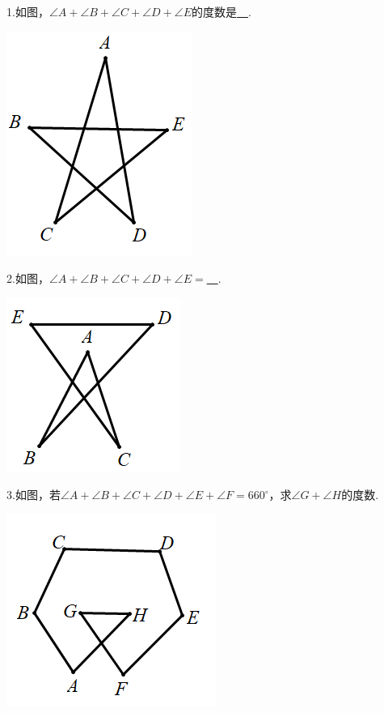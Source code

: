 1.如图，$\angle A+\angle B+\angle C+\angle D+\angle E$的度数是\underline{~\hspace{1cm}~}.

 \includegraphics[scale=0.5]{figure/bazhi09.PNG}
 
2.如图，$\angle A+\angle B+\angle C+\angle D+\angle E=$\underline{~\hspace{1cm}~}.

 \includegraphics[scale=0.5]{figure/bazhi10.PNG}
 
3.如图，若$\angle A+\angle B+\angle C+\angle D+\angle E+\angle F=660^\circ$，求$\angle G+\angle H$的度数.

 \includegraphics[scale=0.5]{figure/bazhi11.PNG}
 
